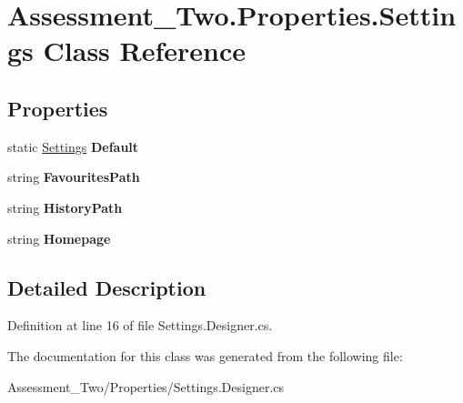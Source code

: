 \hypertarget{class_assessment___two_1_1_properties_1_1_settings}{
\section{Assessment\_\-Two.Properties.Settings Class Reference}
\label{class_assessment___two_1_1_properties_1_1_settings}
}
\subsection*{Properties}
\begin{DoxyCompactItemize}
\item 
\hypertarget{class_assessment___two_1_1_properties_1_1_settings_a5c34e8d7889f282c60cb704bdd38a1dd}{
static \hyperlink{class_assessment___two_1_1_properties_1_1_settings}{Settings} {\bfseries Default}}
\label{class_assessment___two_1_1_properties_1_1_settings_a5c34e8d7889f282c60cb704bdd38a1dd}

\item 
\hypertarget{class_assessment___two_1_1_properties_1_1_settings_acdb04f17e894e61ed764745e66d47e51}{
string {\bfseries FavouritesPath}}
\label{class_assessment___two_1_1_properties_1_1_settings_acdb04f17e894e61ed764745e66d47e51}

\item 
\hypertarget{class_assessment___two_1_1_properties_1_1_settings_a5b014bfe08c648350ca7fadce4f696c3}{
string {\bfseries HistoryPath}}
\label{class_assessment___two_1_1_properties_1_1_settings_a5b014bfe08c648350ca7fadce4f696c3}

\item 
\hypertarget{class_assessment___two_1_1_properties_1_1_settings_a66123c540f5995cc79f1a6e37cd9d4ed}{
string {\bfseries Homepage}}
\label{class_assessment___two_1_1_properties_1_1_settings_a66123c540f5995cc79f1a6e37cd9d4ed}

\end{DoxyCompactItemize}


\subsection{Detailed Description}


Definition at line 16 of file Settings.Designer.cs.



The documentation for this class was generated from the following file:\begin{DoxyCompactItemize}
\item 
Assessment\_\-Two/Properties/Settings.Designer.cs\end{DoxyCompactItemize}
